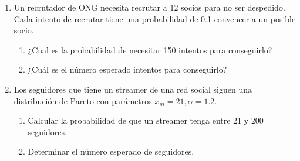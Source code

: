 \documentclass[]{article}
\theoremstyle{plain}
\theoremstyle{definition}
\theoremstyle{definition} %
\begin{document}
\begin{enumerate}
  \item Un recrutador de ONG necesita recrutar a 12 socios para no ser despedido.  
  Cada intento de recrutar tiene una probabilidad de  0.1 convencer a un posible socio. 
  \begin{enumerate}  
  \item ¿Cual es la probabilidad de necesitar 150 intentos para conseguirlo?
  \item ¿Cuál es el número esperado intentos para conseguirlo?  
  \end{enumerate}

  \item   Los seguidores que tiene un streamer de una red social siguen una distribución de Pareto 
  con parámetros $x_m = 21, \alpha = 1.2$. 
  \begin{enumerate}
    \item Calcular la probabilidad de que un streamer tenga  entre 21 y 200 seguidores.
    \item Determinar el número esperado de seguidores.
  \end{enumerate}
 
 
\end{enumerate}
\end{document}
